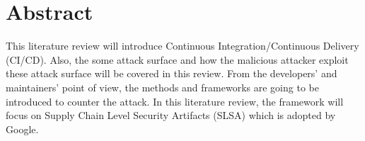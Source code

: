 \section{Abstract}

This literature review will introduce Continuous Integration/Continuous Delivery (CI/CD).
Also, the some attack surface and how the malicious attacker exploit these attack surface
will be covered in this review. From the developers' and maintainers' point of view, the 
methods and frameworks are going to be introduced to counter the attack.
In this literature review, the framework will focus on Supply Chain Level Security Artifacts 
(SLSA) which is adopted by Google. 


